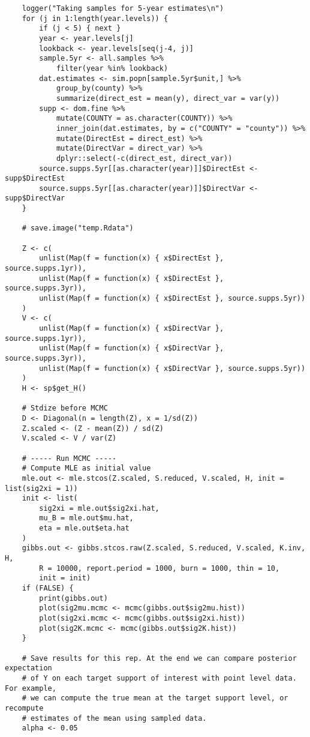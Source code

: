 \documentclass[12pt]{article}
\begin{document}
\begin{scriptsize}
\begin{verbatim}
    logger("Taking samples for 5-year estimates\n")
    for (j in 1:length(year.levels)) {
        if (j < 5) { next }
        year <- year.levels[j]
        lookback <- year.levels[seq(j-4, j)]
        sample.5yr <- all.samples %>%
            filter(year %in% lookback)
        dat.estimates <- sim.popn[sample.5yr$unit,] %>%
            group_by(county) %>%
            summarize(direct_est = mean(y), direct_var = var(y))
        supp <- dom.fine %>%
            mutate(COUNTY = as.character(COUNTY)) %>%
            inner_join(dat.estimates, by = c("COUNTY" = "county")) %>%
            mutate(DirectEst = direct_est) %>%
            mutate(DirectVar = direct_var) %>%
            dplyr::select(-c(direct_est, direct_var))
        source.supps.5yr[[as.character(year)]]$DirectEst <- supp$DirectEst
        source.supps.5yr[[as.character(year)]]$DirectVar <- supp$DirectVar
    }

    # save.image("temp.Rdata")

    Z <- c(
        unlist(Map(f = function(x) { x$DirectEst }, source.supps.1yr)),
        unlist(Map(f = function(x) { x$DirectEst }, source.supps.3yr)),
        unlist(Map(f = function(x) { x$DirectEst }, source.supps.5yr))
    )
    V <- c(
        unlist(Map(f = function(x) { x$DirectVar }, source.supps.1yr)),
        unlist(Map(f = function(x) { x$DirectVar }, source.supps.3yr)),
        unlist(Map(f = function(x) { x$DirectVar }, source.supps.5yr))
    )
    H <- sp$get_H()

    # Stdize before MCMC
    D <- Diagonal(n = length(Z), x = 1/sd(Z))
    Z.scaled <- (Z - mean(Z)) / sd(Z)
    V.scaled <- V / var(Z)

    # ----- Run MCMC -----
    # Compute MLE as initial value
    mle.out <- mle.stcos(Z.scaled, S.reduced, V.scaled, H, init = list(sig2xi = 1))
    init <- list(
        sig2xi = mle.out$sig2xi.hat,
        mu_B = mle.out$mu.hat,
        eta = mle.out$eta.hat
    )
    gibbs.out <- gibbs.stcos.raw(Z.scaled, S.reduced, V.scaled, K.inv, H,
        R = 10000, report.period = 1000, burn = 1000, thin = 10,
        init = init)
    if (FALSE) {
        print(gibbs.out)
        plot(sig2mu.mcmc <- mcmc(gibbs.out$sig2mu.hist))
        plot(sig2xi.mcmc <- mcmc(gibbs.out$sig2xi.hist))
        plot(sig2K.mcmc <- mcmc(gibbs.out$sig2K.hist))
    }

    # Save results for this rep. At the end we can compare posterior expectation
    # of Y on each target support of interest with point level data. For example,
    # we can compute the true mean at the target support level, or recompute
    # estimates of the mean using sampled data.
    alpha <- 0.05


\end{verbatim}
\end{scriptsize}
\end{document}

